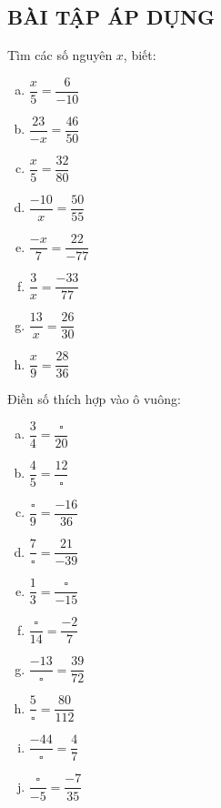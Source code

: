 \subsection{BÀI TẬP ÁP DỤNG}
\begin{bt} 
Tìm các số nguyên $x$, biết:
\begin{multicols}{2}
\begin{enumerate}[a)]
\item $\dfrac{x}{5} =\dfrac{6}{-10}$
\item $\dfrac{23}{-x} = \dfrac{46}{50}$
\item $\dfrac{x}{5}=\dfrac{32}{80}$
\item $\dfrac{-10}{x} =\dfrac{50}{55}$
\item $\dfrac{-x}{7}= \dfrac{22}{-77}$
\item $\dfrac{3}{x} = \dfrac{-33}{77}$
\item $\dfrac{13}{x} = \dfrac{26}{30}$
\item $\dfrac{x}{9}=\dfrac{28}{36}$
\end{enumerate}
\end{multicols}

\end{bt}   \begin{bt}

Điền số thích hợp vào ô vuông:
\begin{multicols}{2}
\begin{enumerate}[a)]
\item $\dfrac{3}{4}= \dfrac{\square}{20}$
\item $\dfrac{4}{5}= \dfrac{12}{\square}$
\item $\dfrac{\square}{9}=\dfrac{-16}{36}$
\item $\dfrac{7}{\square} = \dfrac{21}{-39}$
\item $\dfrac{1}{3}= \dfrac{\square}{-15}$
\item $\dfrac{\square}{14} = \dfrac{-2}{7}$
\item $\dfrac{-13}{\square}= \dfrac{39}{72}$
\item $\dfrac{5}{\square} = \dfrac{80}{112}$
\item $\dfrac{-44}{\square} =\dfrac{4}{7}$
\item $\dfrac{\square}{-5}=\dfrac{-7}{35}$
\end{enumerate}
\end{multicols}

\end{bt}   \begin{bt}


\end{bt}
